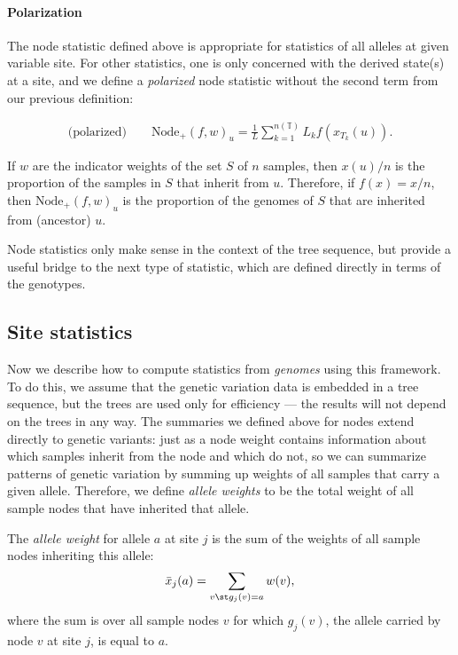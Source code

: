 \documentclass{article}
\newcommand{\nodep}{\mbox{Node}_+} %
\newcommand{\treeseq}{\mathbb{T}} %
\newcommand{\iw}{w} %
\newcommand{\nw}{x} %
\newcommand{\aw}{{\bar x}} %
\begin{document}
\paragraph{Polarization}
The node statistic defined above is appropriate for statistics of all alleles at given variable site.
For other statistics, one is only concerned with the derived state(s) at a site,
and we define a \emph{polarized} node statistic without the second term from our previous definition:

\begin{align}
    \text{(polarized)} \qquad
    \nodep(f, \iw)_u
    =
    \frac{1}{L} \sum_{k=1}^{n(\treeseq)} L_k f(\nw_{T_k}(u)) .
\end{align}

\begin{example} \label{ex:ancestry_props}
    If $\iw$ are the indicator weights of the set $S$ of $n$ samples,
    then $\nw(u) / n$ is the proportion of the samples in $S$ that inherit from $u$.
    Therefore, if $f(x) = x / n$,
    then $\nodep(f, \iw)_u$ is the proportion of the genomes of $S$
    that are inherited from (ancestor) $u$.
\end{example}

Node statistics only make sense in the context of the tree sequence,
but provide a useful bridge to the next type of statistic,
which are defined directly in terms of the genotypes.


\subsection*{Site statistics}

Now we describe how to compute statistics from \emph{genomes} using this framework.
To do this, we assume that the genetic variation data is embedded in a tree sequence,
but the trees are used only for efficiency --- the results will not depend on
the trees in any way. The summaries we defined above for nodes
extend directly to genetic variants: just as a node weight contains information about
which samples inherit from the node and which do not,
so we can summarize patterns of genetic variation by summing up weights of all samples
that carry a given allele.
Therefore, we define \emph{allele weights} to be
the total weight of all sample nodes that have inherited that allele.

\begin{definition}
    The \emph{allele weight} for allele $a$ at site $j$ is the sum of the weights
    of all sample nodes inheriting this allele:
    \begin{align*}
        \aw_j(a) = \sum_{v \st g_j(v) = a} \iw(v) ,
    \end{align*}
    where the sum is over all sample nodes $v$ for which
    $g_j(v)$, the allele carried by node $v$ at site $j$, is equal to $a$.
\end{definition}
\end{document}

